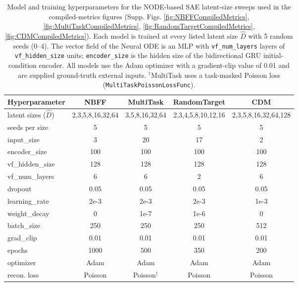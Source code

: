 \documentclass{article}
\begin{document}
\begin{table}[ht]
\centering
\small
\begin{tabular}{|l|c|c|c|c|}
\hline
\textbf{Hyperparameter} & \textbf{NBFF} & \textbf{MultiTask} & \textbf{RandomTarget} & \textbf{CDM} \\ \hline
latent sizes ($\hat{D}$) & 2,3,5,8,16,32,64 & 3,5,8,16,32,64 & 2,3,4,5,8,10,12,16 & 2,3,5,8,16,32,64,128 \\ \hline
seeds per size & 5 & 5 & 5 & 5 \\ \hline
input\_size & 3 & 20 & 17 & 2 \\ \hline
encoder\_size & 100 & 100 & 100 & 100 \\ \hline
vf\_hidden\_size & 128 & 128 & 128 & 128 \\ \hline
vf\_num\_layers & 6 & 6 & 2 & 6 \\ \hline
dropout & 0.05 & 0.05 & 0.05 & 0.05 \\ \hline
learning\_rate & 2e-3 & 2e-3 & 2e-3 & 1e-3 \\ \hline
weight\_decay & 0 & 1e-7 & 1e-6 & 0 \\ \hline
batch\_size & 250 & 250 & 250 & 512 \\ \hline
grad\_clip & 0.01 & 0.01 & 0.01 & 0.01 \\ \hline
epochs & 1000 & 500 & 350 & 200 \\ \hline
optimizer & Adam & Adam & Adam & Adam \\ \hline
recon. loss & Poisson & Poisson$^\dagger$ & Poisson & Poisson \\ \hline
\end{tabular}
\caption{Model and training hyperparameters for the NODE-based SAE latent-size sweeps used in the compiled-metrics figures (Supp. Figs. \ref{fig:NBFFCompiledMetrics}, \ref{fig:MultiTaskCompiledMetrics}, \ref{fig:RandomTargetCompiledMetrics}, \ref{fig:CDMCompiledMetrics}). Each model is trained at every listed latent size $\hat{D}$ with 5 random seeds (0--4). The vector field of the Neural ODE is an MLP with \texttt{vf\_num\_layers} layers of \texttt{vf\_hidden\_size} units; \texttt{encoder\_size} is the hidden size of the bidirectional GRU initial-condition encoder. All models use the Adam optimizer with a gradient-clip value of 0.01 and are supplied ground-truth external inputs. $^\dagger$MultiTask uses a task-masked Poisson loss (\texttt{MultiTaskPoissonLossFunc}).}
\label{table:CompiledMetricsNODE}
\end{table}
\end{document}
